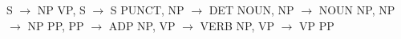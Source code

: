 S $\to$ NP VP, S $\to$ S PUNCT, NP $\to$ DET NOUN, NP $\to$ NOUN NP, NP $\to$ NP PP, PP $\to$ ADP NP, VP $\to$ VERB NP, VP $\to$ VP PP
